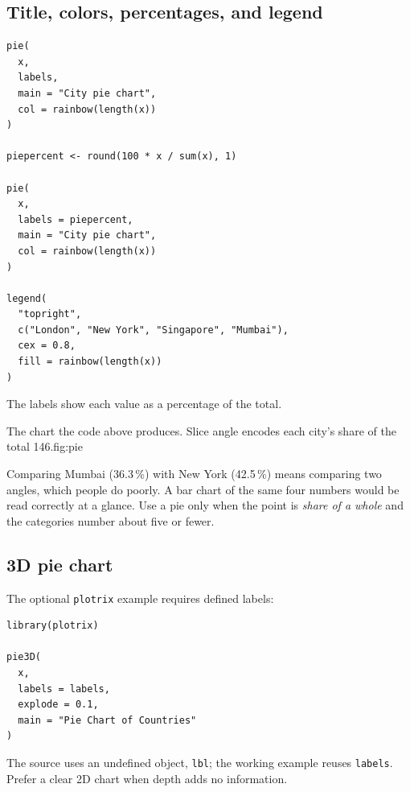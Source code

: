 \subsection{Title, colors, percentages, and legend}

\begin{lstlisting}[style=dsr]
pie(
  x,
  labels,
  main = "City pie chart",
  col = rainbow(length(x))
)

piepercent <- round(100 * x / sum(x), 1)

pie(
  x,
  labels = piepercent,
  main = "City pie chart",
  col = rainbow(length(x))
)

legend(
  "topright",
  c("London", "New York", "Singapore", "Mumbai"),
  cex = 0.8,
  fill = rainbow(length(x))
)
\end{lstlisting}

The labels show each value as a percentage of the total.

\begin{utpfig}{The chart the code above produces. Slice angle encodes
each city's share of the total 146.}{fig:pie}

\end{utpfig}

\begin{pitfall}
Comparing Mumbai (36.3\,\%) with New York (42.5\,\%) means comparing two
angles, which people do poorly. A bar chart of the same four numbers would
be read correctly at a glance. Use a pie only when the point is
\emph{share of a whole} and the categories number about five or fewer.
\end{pitfall}

\subsection{3D pie chart}

The optional \texttt{plotrix} example requires defined labels:

\begin{lstlisting}[style=dsr]
library(plotrix)

pie3D(
  x,
  labels = labels,
  explode = 0.1,
  main = "Pie Chart of Countries"
)
\end{lstlisting}

\begin{pitfall}
The source uses an undefined object, \texttt{lbl}; the working example reuses \texttt{labels}. Prefer a clear 2D chart when depth adds no information.
\end{pitfall}

